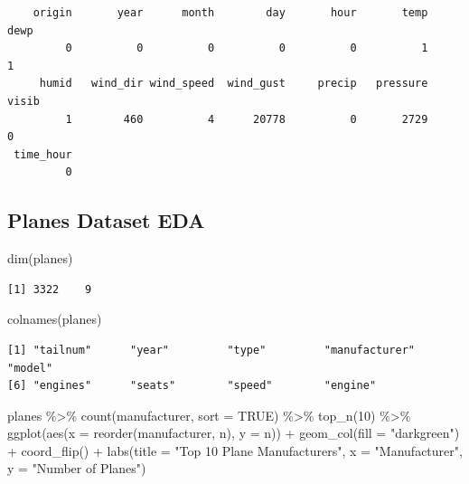 \documentclass[
  10pt,
  letterpaper,
  DIV=11,
  numbers=noendperiod]{scrartcl}
\newenvironment{Shaded}{\begin{snugshade}}{\end{snugshade}}
\newcommand{\AttributeTok}[1]{\textcolor[rgb]{0.40,0.45,0.13}{#1}}
\newcommand{\ConstantTok}[1]{\textcolor[rgb]{0.56,0.35,0.01}{#1}}
\newcommand{\DecValTok}[1]{\textcolor[rgb]{0.68,0.00,0.00}{#1}}
\newcommand{\FunctionTok}[1]{\textcolor[rgb]{0.28,0.35,0.67}{#1}}
\newcommand{\NormalTok}[1]{\textcolor[rgb]{0.00,0.23,0.31}{#1}}
\newcommand{\SpecialCharTok}[1]{\textcolor[rgb]{0.37,0.37,0.37}{#1}}
\newcommand{\StringTok}[1]{\textcolor[rgb]{0.13,0.47,0.30}{#1}}
\begin{document}
\begin{verbatim}
    origin       year      month        day       hour       temp       dewp 
         0          0          0          0          0          1          1 
     humid   wind_dir wind_speed  wind_gust     precip   pressure      visib 
         1        460          4      20778          0       2729          0 
 time_hour 
         0 
\end{verbatim}

\subsection{Planes Dataset EDA}\label{planes-dataset-eda}

\begin{Shaded}
\begin{Highlighting}[numbers=left,,]
\FunctionTok{dim}\NormalTok{(planes)}
\end{Highlighting}
\end{Shaded}

\begin{verbatim}
[1] 3322    9
\end{verbatim}

\begin{Shaded}
\begin{Highlighting}[numbers=left,,]
\FunctionTok{colnames}\NormalTok{(planes)}
\end{Highlighting}
\end{Shaded}

\begin{verbatim}
[1] "tailnum"      "year"         "type"         "manufacturer" "model"       
[6] "engines"      "seats"        "speed"        "engine"      
\end{verbatim}

\begin{Shaded}
\begin{Highlighting}[numbers=left,,]
\NormalTok{planes }\SpecialCharTok{\%\textgreater{}\%}
  \FunctionTok{count}\NormalTok{(manufacturer, }\AttributeTok{sort =} \ConstantTok{TRUE}\NormalTok{) }\SpecialCharTok{\%\textgreater{}\%}
  \FunctionTok{top\_n}\NormalTok{(}\DecValTok{10}\NormalTok{) }\SpecialCharTok{\%\textgreater{}\%}
  \FunctionTok{ggplot}\NormalTok{(}\FunctionTok{aes}\NormalTok{(}\AttributeTok{x =} \FunctionTok{reorder}\NormalTok{(manufacturer, n), }\AttributeTok{y =}\NormalTok{ n)) }\SpecialCharTok{+}
  \FunctionTok{geom\_col}\NormalTok{(}\AttributeTok{fill =} \StringTok{"darkgreen"}\NormalTok{) }\SpecialCharTok{+}
  \FunctionTok{coord\_flip}\NormalTok{() }\SpecialCharTok{+}
  \FunctionTok{labs}\NormalTok{(}\AttributeTok{title =} \StringTok{"Top 10 Plane Manufacturers"}\NormalTok{, }\AttributeTok{x =} \StringTok{"Manufacturer"}\NormalTok{, }\AttributeTok{y =} \StringTok{"Number of Planes"}\NormalTok{)}
\end{Highlighting}
\end{Shaded}
\end{document}
